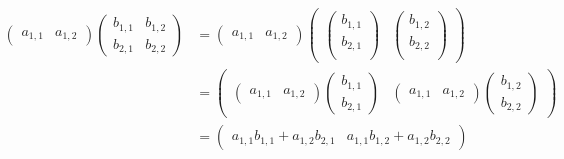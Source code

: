 \documentclass{ximera}
\begin{document}
\begin{align*}
\begin{pmatrix} a_{1,1} & a_{1,2}  \end{pmatrix}
\begin{pmatrix}
  b_{1,1} & b_{1,2} \\
  b_{2,1} & b_{2,2}
\end{pmatrix}
&=
\begin{pmatrix} a_{1,1} & a_{1,2}  \end{pmatrix}%
\begin{pmatrix}
  \begin{pmatrix} b_{1,1} \\ b_{2,1} \\  \end{pmatrix} &
  \begin{pmatrix} b_{1,2} \\ b_{2,2} \\ \end{pmatrix}
\end{pmatrix} \\
&=
\begin{pmatrix}
  \begin{pmatrix} a_{1,1} & a_{1,2} \end{pmatrix}\begin{pmatrix} b_{1,1} \\ b_{2,1} \end{pmatrix} &
  \begin{pmatrix} a_{1,1} & a_{1,2} \end{pmatrix}\begin{pmatrix} b_{1,2} \\ b_{2,2} \end{pmatrix}
\end{pmatrix}\\
&=
\begin{pmatrix}
a_{1,1}b_{1,1}+a_{1,2}b_{2,1} &
a_{1,1}b_{1,2}+a_{1,2}b_{2,2}
\end{pmatrix}
\end{align*}
\end{document}
